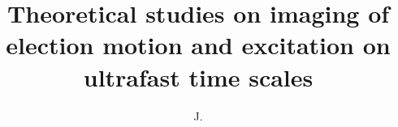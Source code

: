\documentclass[defaultstyle,11pt]{thesis}
\title{Theoretical studies on imaging of election motion and excitation on ultrafast time scales}
\author{J.}{Venzke}
\begin{document}
%
%
%
%
%

%
%

\nocite{*}		%

% 
% 
\end{document}
